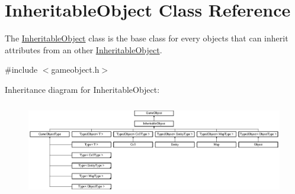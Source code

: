 \hypertarget{class_inheritable_object}{\section{\-Inheritable\-Object \-Class \-Reference}
\label{class_inheritable_object}
}


\-The \hyperlink{class_inheritable_object}{\-Inheritable\-Object} class is the base class for every objects that can inherit attributes from an other \hyperlink{class_inheritable_object}{\-Inheritable\-Object}.  




{\ttfamily \#include $<$gameobject.\-h$>$}

\-Inheritance diagram for \-Inheritable\-Object\-:\begin{figure}[H]
\begin{center}
\leavevmode
\includegraphics[height=4.125230cm]{class_inheritable_object}
\end{center}
\end{figure}
